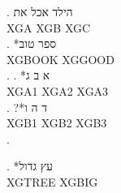 
\ex. \gll הילד אכל את\\
          XGA XGB XGC\\

\exg. *ספר טוב\\
      XGBOOK XGGOOD\\

\ex. \ag. *א ב ג\\ XGA1 XGA2 XGA3\\
\bg. ?*ד ה ו\\ XGB1 XGB2 XGB3\\
\z.

\begingroup
\GlossRTL
\exg. *עץ גדול\\
      XGTREE XGBIG\\
\endgroup

